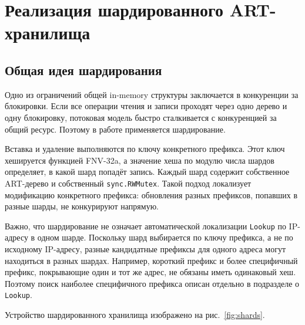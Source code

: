 \section{Реализация шардированного ART-хранилища}
\label{sec:art-storage}

\subsection{Общая идея шардирования}

Одно из ограничений общей in-memory структуры заключается в конкуренции
за блокировки. Если все операции чтения и записи проходят через одно
дерево и одну блокировку, потоковая модель быстро сталкивается с
конкуренцией за общий ресурс. Поэтому в работе применяется
шардирование.

Вставка и удаление выполняются по ключу конкретного префикса. Этот ключ
хешируется функцией FNV-32a, а значение хеша по модулю числа шардов
определяет, в какой шард попадёт запись. Каждый шард содержит собственное
ART-дерево и собственный \texttt{sync.RWMutex}. Такой подход локализует
модификацию конкретного префикса: обновления разных префиксов, попавших
в разные шарды, не конкурируют напрямую.

Важно, что шардирование не означает автоматической локализации
\texttt{Lookup} по IP-адресу в одном шарде. Поскольку шард выбирается по
ключу префикса, а не по исходному IP-адресу, разные кандидатные префиксы
для одного адреса могут находиться в разных шардах. Например, короткий
префикс и более специфичный префикс, покрывающие один и тот же адрес, не
обязаны иметь одинаковый хеш. Поэтому поиск наиболее специфичного
префикса описан отдельно в подразделе о \texttt{Lookup}.

Устройство шардированного хранилища изображено на рис.~\ref{fig:shards}.

